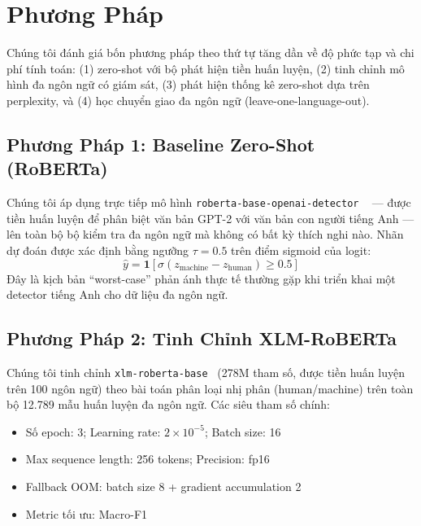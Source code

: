 
\section{Phương Pháp}
\label{sec:method}

Chúng tôi đánh giá bốn phương pháp theo thứ tự tăng dần về độ phức tạp
và chi phí tính toán: (1) zero-shot với bộ phát hiện tiền huấn luyện,
(2) tinh chỉnh mô hình đa ngôn ngữ có giám sát, (3) phát hiện thống
kê zero-shot dựa trên perplexity, và (4) học chuyển giao đa ngôn ngữ
(leave-one-language-out).

\subsection{Phương Pháp 1: Baseline Zero-Shot (RoBERTa)}

Chúng tôi áp dụng trực tiếp mô hình \texttt{roberta-base-openai-detector}
~\cite{solaiman2019gpt2detector} --- được tiền huấn luyện để phân biệt
văn bản GPT-2 với văn bản con người tiếng Anh --- lên toàn bộ bộ kiểm
tra đa ngôn ngữ mà không có bất kỳ thích nghi nào. Nhãn dự đoán được
xác định bằng ngưỡng $\tau = 0.5$ trên điểm sigmoid của logit:
\[
\hat{y} = \mathbf{1}\!\left[\sigma(z_{\text{machine}} - z_{\text{human}}) \geq 0.5\right]
\]
Đây là kịch bản ``worst-case'' phản ánh thực tế thường gặp khi triển
khai một detector tiếng Anh cho dữ liệu đa ngôn ngữ.

\subsection{Phương Pháp 2: Tinh Chỉnh XLM-RoBERTa}

Chúng tôi tinh chỉnh \texttt{xlm-roberta-base}~\cite{conneau2020xlmr}
(278M tham số, được tiền huấn luyện trên 100 ngôn ngữ) theo bài toán
phân loại nhị phân (human/machine) trên toàn bộ 12.789 mẫu huấn luyện
đa ngôn ngữ. Các siêu tham số chính:

\begin{itemize}
    \item Số epoch: 3; Learning rate: $2 \times 10^{-5}$; Batch size: 16
    \item Max sequence length: 256 tokens; Precision: fp16
    \item Fallback OOM: batch size 8 + gradient accumulation 2
    \item Metric tối ưu: Macro-F1
\end{itemize}

